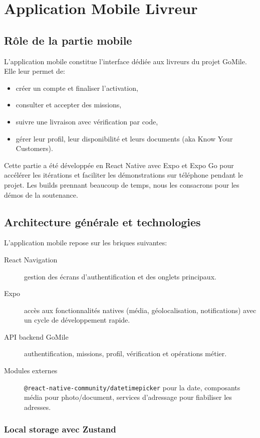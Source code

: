 \newpage
\section{Application Mobile Livreur}

\subsection{Rôle de la partie mobile}

L'application mobile constitue l'interface dédiée aux livreurs du projet GoMile. Elle leur permet de:
\begin{itemize}
    \item créer un compte et finaliser l'activation,
    \item consulter et accepter des missions,
    \item suivre une livraison avec vérification par code,
    \item gérer leur profil, leur disponibilité et leurs documents  (aka Know Your Customers).
\end{itemize}

Cette partie a été développée en React Native avec Expo et Expo Go pour accélérer les itérations et faciliter les démonstrations sur téléphone pendant le projet. Les builds prennant beaucoup de temps, nous les consacrons pour les démos de la soutenance.

\subsection{Architecture générale et technologies}

L'application mobile repose sur les briques suivantes:
\begin{description}
    \item[React Navigation] gestion des écrans d'authentification et des onglets principaux.
    \item[Expo] accès aux fonctionnalités natives (média, géolocalisation, notifications) avec un cycle de développement rapide.
    \item[API backend GoMile] authentification, missions, profil, vérification et opérations métier.
    \item[Modules externes] \texttt{@react-native-community/datetimepicker} pour la date, composants média pour photo/document, services d'adressage pour fiabiliser les adresses.
\end{description}

\subsubsection{Local storage avec Zustand}

